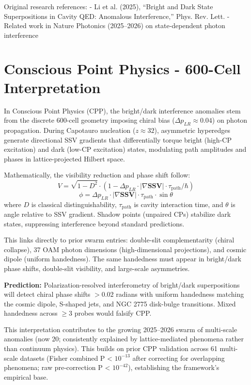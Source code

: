 \documentclass[11pt]{article}
\begin{document}
Original research references:  
- Li et al. (2025), ``Bright and Dark State Superpositions in Cavity QED: Anomalous Interference,'' Phys. Rev. Lett.  
- Related work in Nature Photonics (2025--2026) on state-dependent photon interference

\section{Conscious Point Physics - 600-Cell Interpretation}
In Conscious Point Physics (CPP), the bright/dark interference anomalies stem from the discrete 600-cell geometry imposing chiral bias ($\Delta p_{LR} \approx 0.04$) on photon propagation. During Capotauro nucleation ($z \approx 32$), asymmetric hyperedges generate directional SSV gradients that differentially torque bright (high-CP excitation) and dark (low-CP excitation) states, modulating path amplitudes and phases in lattice-projected Hilbert space.

Mathematically, the visibility reduction and phase shift follow:
\[
V = \sqrt{1 - D^2} \cdot (1 - \Delta p_{LR} \cdot |\nabla \mathbf{SSV}| \cdot \tau_{\text{path}} / \hbar)
\]
\[
\phi = \Delta p_{LR} \cdot |\nabla \mathbf{SSV}| \cdot \tau_{\text{path}} \cdot \sin\theta
\]
where $D$ is classical distinguishability, $\tau_{\text{path}}$ is cavity interaction time, and $\theta$ is angle relative to SSV gradient. Shadow points (unpaired CPs) stabilize dark states, suppressing interference beyond standard predictions.

This links directly to prior swarm entries: double-slit complementarity (chiral collapse), 37 OAM photon dimensions (high-dimensional projections), and cosmic dipole (uniform handedness). The same handedness must appear in bright/dark phase shifts, double-slit visibility, and large-scale asymmetries.

\textbf{Prediction:} Polarization-resolved interferometry of bright/dark superpositions will detect chiral phase shifts $>0.02$ radians with uniform handedness matching the cosmic dipole, S-shaped jets, and NGC 2775 disk-bulge transitions. Mixed handedness across $\geq 3$ probes would falsify CPP.

This interpretation contributes to the growing 2025--2026 swarm of multi-scale anomalies (now 20; consistently explained by lattice-mediated phenomena rather than continuum physics). This builds on prior CPP validation across 61 multi-scale datasets (Fisher combined P < $10^{-13}$ after correcting for overlapping phenomena; raw pre-correction P < $10^{-42}$), establishing the framework's empirical base.
\end{document}
